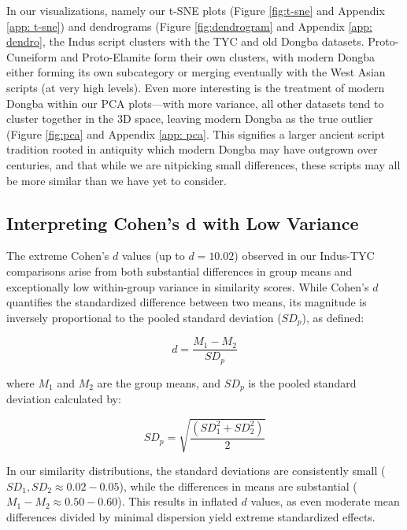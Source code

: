 \documentclass[11pt,a4paper,oneside]{report}
\begin{document}
In our visualizations, namely our t-SNE plots (Figure \ref{fig:t-sne} and Appendix \ref{app: t-sne}) and dendrograms (Figure \ref{fig:dendrogram} and Appendix \ref{app: dendro}, the Indus script clusters with the TYC and old Dongba datasets. Proto-Cuneiform and Proto-Elamite form their own clusters, with modern Dongba either forming its own subcategory or merging eventually with the West Asian scripts (at very high levels). Even more interesting is the treatment of modern Dongba within our PCA plots—with more variance, all other datasets tend to cluster together in the 3D space, leaving modern Dongba as the true outlier (Figure \ref{fig:pca} and Appendix \ref{app: pca}. This signifies a larger ancient script tradition rooted in antiquity which modern Dongba may have outgrown over centuries, and that while we are nitpicking small differences, these scripts may all be more similar than we have yet to consider.

\subsection{Interpreting Cohen's d with Low Variance}
\noindent\hspace{1cm}

The extreme Cohen’s $d$ values (up to $d=10.02$) observed in our Indus-TYC comparisons arise from both substantial differences in group means and exceptionally low within-group variance in similarity scores. While Cohen’s $d$ quantifies the standardized difference between two means, its magnitude is inversely proportional to the pooled standard deviation ($SD_p$), as defined:

\begin{equation}
d = \frac{M_1 - M_2}{SD_p}
\end{equation}

\noindent where $M_1$ and $M_2$ are the group means, and $SD_p$ is the pooled standard deviation calculated by:

\begin{equation}
SD_p = \sqrt{\frac{(SD_1^2 + SD_2^2)}{2}}
\end{equation}

In our similarity distributions, the standard deviations are consistently small ($SD_1, SD_2 \approx 0.02 - 0.05$), while the differences in means are substantial ($M_1 - M_2 \approx 0.50 - 0.60$). This results in inflated $d$ values, as even moderate mean differences divided by minimal dispersion yield extreme standardized effects.
\end{document}
